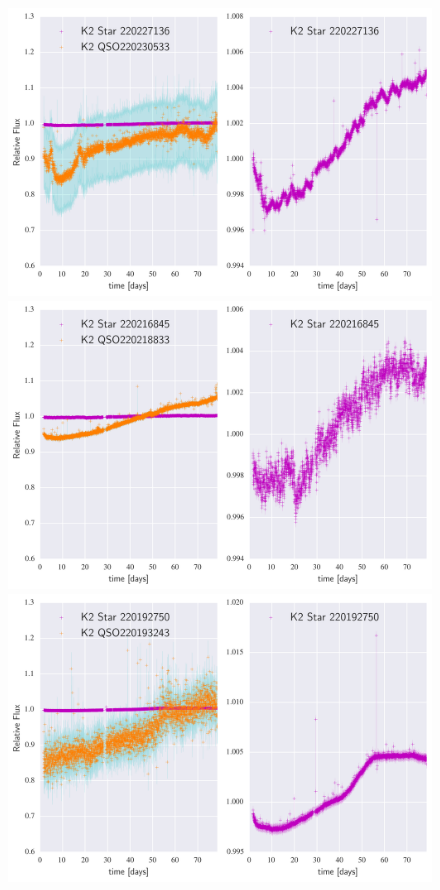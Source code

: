 \documentclass[a4paper,fleqn,usenatbib]{mnras}
\begin{document}
    \begin{figure}
 	\includegraphics[width=\columnwidth]{220230533NearestNeighbor.png}
 	\includegraphics[width=\columnwidth]{220218833NearestNeighbor.png}
 	\includegraphics[width=\columnwidth]{220193243NearestNeighbor.png}
    	\label{fig:example_figure}
    \end{figure}
    
\end{document}
